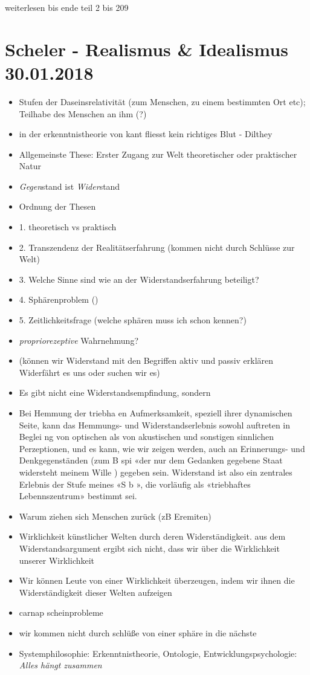 \documentclass[emulatestandardclasses]{scrartcl}
\begin{document}
weiterlesen bis ende teil 2 bis 209

\section{Scheler - Realismus \& Idealismus\\30.01.2018}

\begin{itemize}
  \item Stufen der Daseinsrelativität (zum Menschen, zu einem bestimmten Ort etc); Teilhabe des Menschen an ihm (?)
  \item in der erkenntnistheorie von kant fliesst kein richtiges Blut - Dilthey
  \item Allgemeinste These: Erster Zugang zur Welt theoretischer oder praktischer Natur 
  \item \emph{Gegen}stand ist \emph{Wider}stand
  \item Ordnung der Thesen
  \item 1. theoretisch vs praktisch
  \item 2. Transzendenz der Realitätserfahrung (kommen nicht durch Schlüsse zur Welt)
  \item 3. Welche Sinne sind wie an der Widerstandserfahrung beteiligt?
  \item 4. Sphärenproblem ()
  \item 5. Zeitlichkeitsfrage (welche sphären muss ich schon kennen?)
  \item \emph{propriorezeptive} Wahrnehmung?
  \item (können wir Widerstand mit den Begriffen aktiv und passiv erklären Widerfährt es uns oder suchen wir es)
  \item 
  
  Es gibt nicht eine Widerstandsempfindung, sondern 
  \item Bei Hemmung der triebha en Aufmerksamkeit, speziell ihrer dynamischen Seite, kann das Hemmungs- und Widerstandserlebnis sowohl auftreten in Beglei ng von optischen als von akustischen und sonstigen sinnlichen Perzeptionen, und
es kann, wie wir zeigen werden, auch an Erinnerungs- und Denkgegenständen (zum B spi  «der nur dem Gedanken gegebene Staat widersteht meinem Wille ) gegeben sein. Widerstand ist also ein zentrales Erlebnis der Stufe meines «S b », die vorläufig als «triebhaftes Lebennszentrum» bestimmt sei.
\item Warum ziehen sich Menschen zurück (zB Eremiten)
\item Wirklichkeit künstlicher Welten durch deren Widerständigkeit. aus dem Widerstandsargument ergibt sich nicht, dass wir über die Wirklichkeit unserer Wirklichkeit
\item Wir können Leute von einer Wirklichkeit überzeugen, indem wir ihnen die Widerständigkeit dieser Welten aufzeigen
\item carnap scheinprobleme
\item wir kommen nicht durch schlüße von einer sphäre in die nächste
\item Systemphilosophie: Erkenntnistheorie, Ontologie, Entwicklungspsychologie: \emph{Alles hängt zusammen}
\end{itemize}
\end{document}
